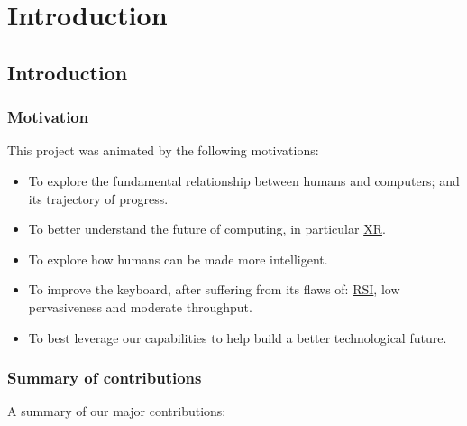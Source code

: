 \documentclass[logo,bsc,singlespacing,parskip]{infthesis}
\begin{document}
\part*{Introduction}
\label{sec:org38fd2ca}
\fi

\chapter*{Introduction}
\label{sec:org434c402}

\section*{Motivation}
\label{sec:orge1a6e9c}
This project was animated by the following motivations:

\begin{itemize}
\item To explore the fundamental relationship between humans and computers; and its trajectory of progress.
\item To better understand the future of computing, in particular \hyperref[org53dbe83]{XR}.
\item To explore how humans can be made more intelligent.
\item To improve the keyboard, after suffering from its flaws of: \hyperref[orgafdb7af]{RSI}, low pervasiveness and moderate throughput.
\item To best leverage our capabilities to help build a better technological future.
\end{itemize}

\section*{Summary of contributions}
\label{sec:orgecbe470}
A summary of our major contributions:
\end{document}
